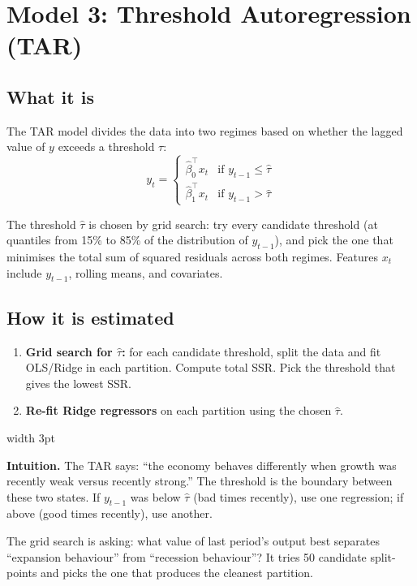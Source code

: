 \documentclass[11pt, a4paper]{article}
\newenvironment{intubox}{%
  \vspace{4pt}\par\noindent%
  {\color{darkblue}\vrule width 3pt}\hspace{6pt}%
  \begin{minipage}{\dimexpr\linewidth-9pt\relax}\vspace{2pt}%
}{%
  \vspace{2pt}\end{minipage}\par\vspace{4pt}%
}
\begin{document}
\section{Model 3: Threshold Autoregression (TAR)}

\subsection{What it is}

The TAR model divides the data into two regimes based on whether the lagged
value of $y$ exceeds a threshold $\tau$:
\[
  y_t = \begin{cases}
    \hat\beta_0^\top x_t & \text{if } y_{t-1} \leq \hat\tau \\
    \hat\beta_1^\top x_t & \text{if } y_{t-1} > \hat\tau
  \end{cases}
\]

The threshold $\hat\tau$ is chosen by grid search: try every candidate
threshold (at quantiles from 15\% to 85\% of the distribution of $y_{t-1}$),
and pick the one that minimises the total sum of squared residuals across both
regimes. Features $x_t$ include $y_{t-1}$, rolling means, and covariates.

\subsection{How it is estimated}

\begin{enumerate}[leftmargin=*, itemsep=2pt]
  \item \textbf{Grid search for $\hat\tau$:} for each candidate threshold, split
        the data and fit OLS/Ridge in each partition. Compute total SSR. Pick the
        threshold that gives the lowest SSR.
  \item \textbf{Re-fit Ridge regressors} on each partition using the chosen $\hat\tau$.
\end{enumerate}

\begin{intubox}
\textbf{Intuition.}
The TAR says: ``the economy behaves differently when growth was recently weak
versus recently strong.'' The threshold is the boundary between these two
states. If $y_{t-1}$ was below $\hat\tau$ (bad times recently), use one
regression; if above (good times recently), use another.

The grid search is asking: what value of last period's output best separates
``expansion behaviour'' from ``recession behaviour''? It tries 50 candidate
split-points and picks the one that produces the cleanest partition.
\end{intubox}
\end{document}
